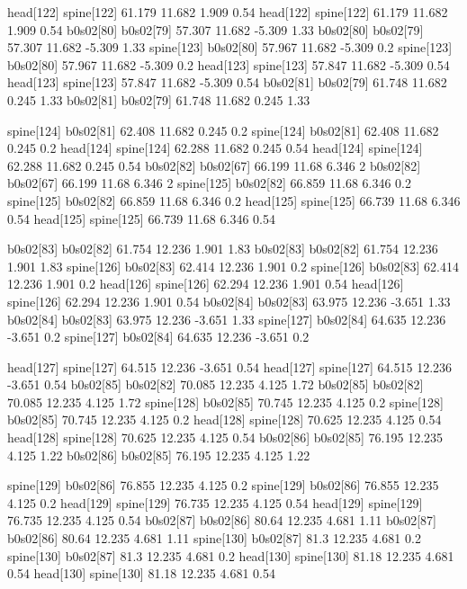 head[122]    spine[122]    61.179    11.682    1.909    0.54
head[122]    spine[122]    61.179    11.682    1.909    0.54
b0s02[80]    b0s02[79]    57.307    11.682    -5.309    1.33
b0s02[80]    b0s02[79]    57.307    11.682    -5.309    1.33
spine[123]    b0s02[80]    57.967    11.682    -5.309    0.2
spine[123]    b0s02[80]    57.967    11.682    -5.309    0.2
head[123]    spine[123]    57.847    11.682    -5.309    0.54
head[123]    spine[123]    57.847    11.682    -5.309    0.54
b0s02[81]    b0s02[79]    61.748    11.682    0.245    1.33
b0s02[81]    b0s02[79]    61.748    11.682    0.245    1.33


spine[124]    b0s02[81]    62.408    11.682    0.245    0.2
spine[124]    b0s02[81]    62.408    11.682    0.245    0.2
head[124]    spine[124]    62.288    11.682    0.245    0.54
head[124]    spine[124]    62.288    11.682    0.245    0.54
b0s02[82]    b0s02[67]    66.199    11.68    6.346    2
b0s02[82]    b0s02[67]    66.199    11.68    6.346    2
spine[125]    b0s02[82]    66.859    11.68    6.346    0.2
spine[125]    b0s02[82]    66.859    11.68    6.346    0.2
head[125]    spine[125]    66.739    11.68    6.346    0.54
head[125]    spine[125]    66.739    11.68    6.346    0.54


b0s02[83]    b0s02[82]    61.754    12.236    1.901    1.83
b0s02[83]    b0s02[82]    61.754    12.236    1.901    1.83
spine[126]    b0s02[83]    62.414    12.236    1.901    0.2
spine[126]    b0s02[83]    62.414    12.236    1.901    0.2
head[126]    spine[126]    62.294    12.236    1.901    0.54
head[126]    spine[126]    62.294    12.236    1.901    0.54
b0s02[84]    b0s02[83]    63.975    12.236    -3.651    1.33
b0s02[84]    b0s02[83]    63.975    12.236    -3.651    1.33
spine[127]    b0s02[84]    64.635    12.236    -3.651    0.2
spine[127]    b0s02[84]    64.635    12.236    -3.651    0.2


head[127]    spine[127]    64.515    12.236    -3.651    0.54
head[127]    spine[127]    64.515    12.236    -3.651    0.54
b0s02[85]    b0s02[82]    70.085    12.235    4.125    1.72
b0s02[85]    b0s02[82]    70.085    12.235    4.125    1.72
spine[128]    b0s02[85]    70.745    12.235    4.125    0.2
spine[128]    b0s02[85]    70.745    12.235    4.125    0.2
head[128]    spine[128]    70.625    12.235    4.125    0.54
head[128]    spine[128]    70.625    12.235    4.125    0.54
b0s02[86]    b0s02[85]    76.195    12.235    4.125    1.22
b0s02[86]    b0s02[85]    76.195    12.235    4.125    1.22


spine[129]    b0s02[86]    76.855    12.235    4.125    0.2
spine[129]    b0s02[86]    76.855    12.235    4.125    0.2
head[129]    spine[129]    76.735    12.235    4.125    0.54
head[129]    spine[129]    76.735    12.235    4.125    0.54
b0s02[87]    b0s02[86]    80.64    12.235    4.681    1.11
b0s02[87]    b0s02[86]    80.64    12.235    4.681    1.11
spine[130]    b0s02[87]    81.3    12.235    4.681    0.2
spine[130]    b0s02[87]    81.3    12.235    4.681    0.2
head[130]    spine[130]    81.18    12.235    4.681    0.54
head[130]    spine[130]    81.18    12.235    4.681    0.54


